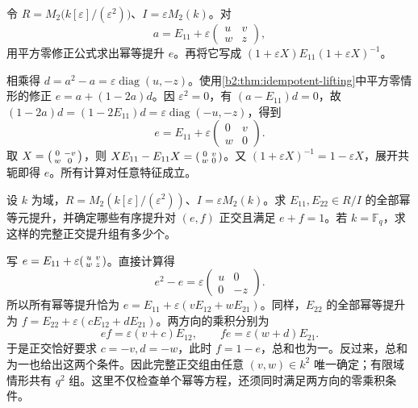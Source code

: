 \begin{exercise}\label{b2:ex:15-square-zero-matrix-lift}
	令 \(R=M_2\bigl(k[\varepsilon]/(\varepsilon^2)\bigr)\)、\(I=\varepsilon M_2(k)\)。对
	\[
		a=E_{11}+\varepsilon\begin{pmatrix}u&v\\w&z\end{pmatrix},
	\]
	用平方零修正公式求出幂等提升 \(e\)。再将它写成 \((1+\varepsilon X)E_{11}(1+\varepsilon X)^{-1}\)。
\end{exercise}
\begin{solution}
	相乘得 \(d=a^2-a=\varepsilon\operatorname{diag}(u,-z)\)。使用\cref{b2:thm:idempotent-lifting}中平方零情形的修正 \(e=a+(1-2a)d\)。因 \(\varepsilon^2=0\)，有 \((a-E_{11})d=0\)，故 \((1-2a)d=(1-2E_{11})d=\varepsilon\operatorname{diag}(-u,-z)\)，得到
	\[
		e=E_{11}+\varepsilon\begin{pmatrix}0&v\\w&0\end{pmatrix}.
	\]
	取 \(X=\begin{psmallmatrix}0&-v\\w&0\end{psmallmatrix}\)，则 \(XE_{11}-E_{11}X=\begin{psmallmatrix}0&v\\w&0\end{psmallmatrix}\)。又 \((1+\varepsilon X)^{-1}=1-\varepsilon X\)，展开共轭即得 \(e\)。所有计算对任意特征成立。
\end{solution}

\begin{exercise}\label{b2:ex:15-compatible-idempotent-lifts}
	设 \(k\) 为域，\(R=M_2(k[\varepsilon]/(\varepsilon^2))\)、\(I=\varepsilon M_2(k)\)。求 \(E_{11},E_{22}\in R/I\) 的全部幂等元提升，并确定哪些有序提升对 \((e,f)\) 正交且满足 \(e+f=1\)。若 \(k=\mathbb F_q\)，求这样的完整正交提升组有多少个。
\end{exercise}
\begin{solution}
	写 \(e=E_{11}+\varepsilon\begin{psmallmatrix}u&v\\w&z\end{psmallmatrix}\)。直接计算得
	\[
		e^2-e=\varepsilon\begin{pmatrix}u&0\\0&-z\end{pmatrix}.
	\]
	所以所有幂等提升恰为 \(e=E_{11}+\varepsilon(vE_{12}+wE_{21})\)。同样，\(E_{22}\) 的全部幂等提升为 \(f=E_{22}+\varepsilon(cE_{12}+dE_{21})\)。两方向的乘积分别为
	\[
		ef=\varepsilon(v+c)E_{12},\qquad fe=\varepsilon(w+d)E_{21}.
	\]
	于是正交恰好要求 \(c=-v,d=-w\)，此时 \(f=1-e\)，总和也为一。反过来，总和为一也给出这两个条件。因此完整正交组由任意 \((v,w)\in k^2\) 唯一确定；有限域情形共有 \(q^2\) 组。这里不仅检查单个幂等方程，还须同时满足两方向的零乘积条件。
\end{solution}

